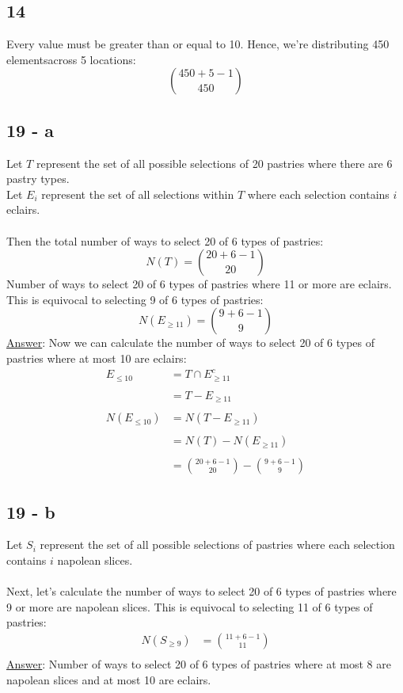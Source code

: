 \documentclass[12pt]{article}
\begin{document}
\subsection*{14}
Every value must be greater than or equal to 10. Hence, we're distributing 450 elementsacross 5 locations:
$$\binom{450+5-1}{450}$$
\subsection*{19 - a}
Let $T$ represent the set of all possible selections of 20 pastries where there are 6 pastry types. \\
Let $E_i$ represent the set of all selections within $T$ where each selection contains $i$ eclairs. 
\\ \\
Then the total number of ways to select 20 of 6 types of pastries:
$$N(T) = \binom{20+6-1}{20}$$
Number of ways to select 20 of 6 types of pastries where 11 or more are eclairs.
This is equivocal to selecting 9 of 6 types of pastries:
$$N(E_{\geq11}) = \binom{9+6-1}{9}$$
\underline{Answer}: Now we can calculate the number of ways to select 20 of 6 types of pastries where at most 10 are eclairs:
\begin{align*}
  E_{\leq10} &= T \cap E_{\geq11}^c \\
  \\
  &= T - E_{\geq11} \\
  \\
  N(E_{\leq10}) &= N(T - E_{\geq11}) \\
  \\
  &= N(T) - N(E_{\geq11})\\
  \\
  &= \binom{20+6-1}{20} - \binom{9+6-1}{9}
\end{align*}
\subsection*{19 - b}
Let $S_i$ represent the set of all possible selections of pastries where each selection contains  $i$ napolean slices.
\\ \\
Next, let's calculate the number of ways to select 20 of 6 types of pastries where 9 or more are napolean slices.
This is equivocal to selecting 11 of 6 types of pastries: \\
\begin{align*}
  N(S_{\geq9}) &= \binom{11+6-1}{11} \\
\end{align*}
\underline{Answer}: Number of ways to select 20 of 6 types of pastries where at most 8 are napolean slices and at most 10 are eclairs.
\end{document}
